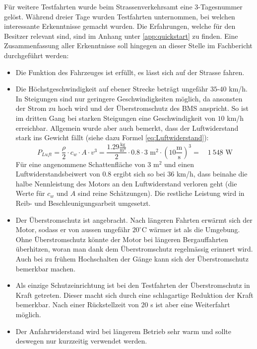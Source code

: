 Für weitere Testfahrten wurde beim Strassenverkehrsamt eine 3-Tagesnummer gelöst. Während dreier Tage wurden Testfahrten unternommen, bei welchen interessante Erkenntnisse gemacht wurden. Die Erfahrungen, welche für den Besitzer relevant sind, sind im Anhang unter \ref{app:quickstart} zu finden. Eine Zusammenfassung aller Erkenntnisse soll hingegen an dieser Stelle im Fachbericht durchgeführt werden: \begin{itemize}
	\item Die Funktion des Fahrzeuges ist erfüllt, es lässt sich auf der Strasse fahren.
	\item Die Höchstgeschwindigkeit auf ebener Strecke beträgt ungefähr $35$-$40$ km/h. In Steigungen sind nur geringere Geschwindigkeiten möglich, da ansonsten der Strom zu hoch wird und der Überstromschutz des BMS anspricht. So ist im dritten Gang bei starken Steigungen eine Geschwindigkeit von $10$ km/h erreichbar. Allgemein wurde aber auch bemerkt, dass der Luftwiderstand stark ins Gewicht fällt (siehe dazu Formel \ref{eq:Luftwiderstand}):
	\begin{equation}
		P_{Luft}=\frac{\rho}{2}\cdot c_w\cdot A\cdot v^3=\frac{1.29\frac{\text{kg}}{\text{m}^3}}{2}\cdot 0.8\cdot 3\text{ m}^2\cdot\left(10\frac{\text{m}}{\text{s}}\right)^3=\quad\underline{1\ 548\text{ W}}
	\label{eq:Luftwiderstand}
	\end{equation}
	Für eine angenommene Schattenfläche von $3$ m$^2$ und einen Luftwiderstandsbeiwert von 0.8 ergibt sich so bei $36$ km/h, dass beinahe die halbe Nennleistung des Motors an den Luftwiderstand verloren geht (die Werte für $c_w$ und $A$ sind reine Schätzungen). Die restliche Leistung wird in Reib- und Beschleunigungsarbeit umgesetzt.
	\item Der Überstromschutz ist angebracht. Nach längeren Fahrten erwärmt sich der Motor, sodass er von aussen ungefähr $20^\circ$C wärmer ist als die Umgebung. Ohne Überstromschutz könnte der Motor bei längeren Bergauffahrten überhitzen, woran man dank dem Überstromschutz regelmässig erinnert wird. Auch bei zu frühem Hochschalten der Gänge kann sich der Überstromschutz bemerkbar machen.\pagebreak
	\item Als einzige Schutzeinrichtung ist bei den Testfahrten der Überstromschutz in Kraft getreten. Dieser macht sich durch eine schlagartige Reduktion der Kraft bemerkbar. Nach einer Rückstellzeit von $20$ s ist aber eine Weiterfahrt möglich.
	\item Der Anfahrwiderstand wird bei längerem Betrieb sehr warm und sollte deswegen nur kurzzeitig verwendet werden.

\end{itemize}
